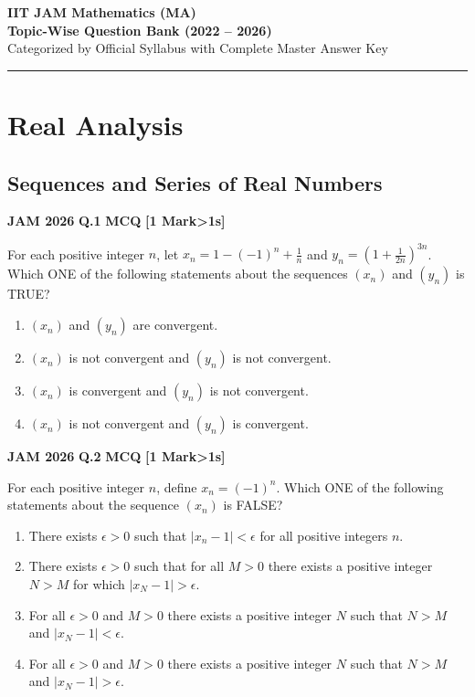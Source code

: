 \documentclass[11pt,a4paper]{article}
\newcommand{\pyqheader}[4]{%
    \noindent\begin{tcolorbox}[
        colback=badgebg,
        colframe=secondary,
        arc=2mm,
        boxrule=0.6pt,
        top=1.5mm,bottom=1.5mm,left=2mm,right=2mm
    ]
        \textbf{\textcolor{primary}{JAM #1}} \hfill \textbf{Q.#2} \hfill \textsc{\textbf{#3}} \hfill \textbf{[#4 Mark\ifnum#4>1s\fi]}
    \end{tcolorbox}\vspace{-1mm}
}
\begin{document}
\begin{center}
    {\huge \textbf{\color{primary}IIT JAM Mathematics (MA)}}\\[2mm]
    {\Large \textbf{Topic-Wise Question Bank (2022 -- 2026)}}\\[1.5mm]
    {\normalsize Categorized by Official Syllabus with Complete Master Answer Key}
\end{center}

\tableofcontents
\vspace{5mm}
\hrule
\vspace{5mm}

\section{Real Analysis}

\subsection{Sequences and Series of Real Numbers}

\pyqheader{2026}{1}{MCQ}{1}
For each positive integer $n$, let $x_{n}=1-(-1)^{n}+\frac{1}{n}$ and $y_{n}=\left(1+\frac{1}{2n}\right)^{3n}$. Which ONE of the following statements about the sequences $(x_{n})$ and $(y_{n})$ is TRUE?
\begin{enumerate}[label=(\Alph*)]
    \item $(x_{n})$ and $(y_{n})$ are convergent.
    \item $(x_{n})$ is not convergent and $(y_{n})$ is not convergent.
    \item $(x_{n})$ is convergent and $(y_{n})$ is not convergent.
    \item $(x_{n})$ is not convergent and $(y_{n})$ is convergent.
\end{enumerate}

\pyqheader{2026}{2}{MCQ}{1}
For each positive integer $n$, define $x_{n}=(-1)^{n}$. Which ONE of the following statements about the sequence $(x_{n})$ is FALSE?
\begin{enumerate}[label=(\Alph*)]
    \item There exists $\epsilon>0$ such that $|x_{n}-1| < \epsilon$ for all positive integers $n$.
    \item There exists $\epsilon>0$ such that for all $M>0$ there exists a positive integer $N>M$ for which $|x_{N}-1|>\epsilon$.
    \item For all $\epsilon>0$ and $M>0$ there exists a positive integer $N$ such that $N>M$ and $|x_{N}-1|<\epsilon$.
    \item For all $\epsilon>0$ and $M>0$ there exists a positive integer $N$ such that $N>M$ and $|x_{N}-1|>\epsilon$.
\end{enumerate}
\end{document}
